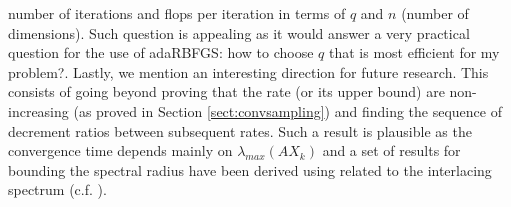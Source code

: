 \documentclass[12pt,conference,compsocconf]{IEEEtran}
\begin{document}
number of iterations and flops per iteration in terms of $q$ and $n$ (number of dimensions). Such question is appealing as it would answer a very practical question for the use of adaRBFGS: how to choose $q$ that is most efficient for my problem?. Lastly, we mention an interesting direction for future research. This consists of going beyond proving that the rate (or its upper bound) are non-increasing (as proved in Section \ref{sect:convsampling}) and finding the sequence of decrement ratios between subsequent rates. Such a result is plausible as the convergence time depends mainly on $\lambda_{max}(AX_k)$ and a set of results for bounding the spectral radius have been derived using related to the interlacing spectrum (c.f. \cite{Mercer,Horne}).




%
\end{document}
